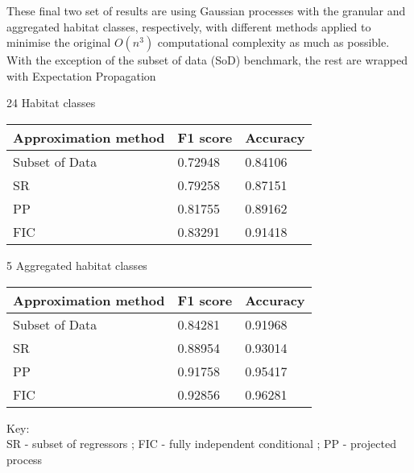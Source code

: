 \documentclass{beamer}
\begin{document}
\begin{frame}
    These final two set of results are using Gaussian processes with the granular and aggregated habitat classes, respectively, with different methods applied to minimise the original $O(n^3)$ computational complexity as much as possible. With the exception of the subset of data (SoD) benchmark, the rest are wrapped with Expectation Propagation

    {\scriptsize
    24 Habitat classes 

    \begin{tabular}{l | l | l}
        Approximation method    & F1 score & Accuracy \\\hline
        Subset of Data          & 0.72948 & 0.84106 \\
        SR                      & 0.79258 & 0.87151 \\
        PP                      & 0.81755 & 0.89162 \\
        FIC                     & 0.83291 & 0.91418
    \end{tabular}

    5 Aggregated habitat classes

    \begin{tabular}{l | l | l}
        Approximation method    & F1 score & Accuracy \\\hline
        Subset of Data          & 0.84281 & 0.91968 \\
        SR                      & 0.88954 & 0.93014 \\
        PP                      & 0.91758 & 0.95417 \\
        FIC                     & 0.92856 & 0.96281 
    \end{tabular}

    }

    {\tiny
    Key:\\
    SR - subset of regressors ; FIC - fully independent conditional ; PP - projected process
    }
\end{frame}
\end{document}
